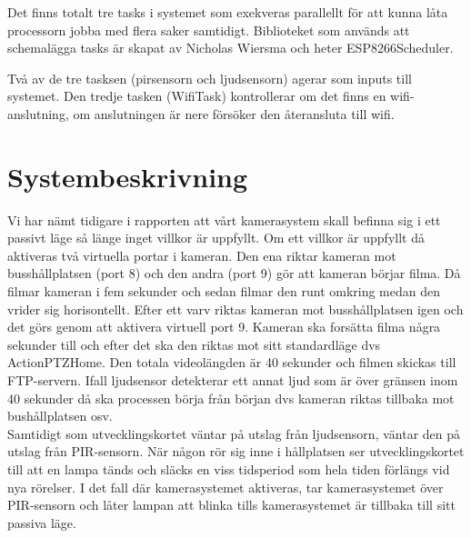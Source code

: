 Det finns totalt tre tasks i systemet som exekveras parallellt för att kunna låta processorn
jobba med flera saker samtidigt. Biblioteket som används att schemalägga tasks är skapat av Nicholas Wiersma och heter ESP8266Scheduler.

Två av de tre tasksen (pirsensorn och ljudsensorn) agerar som inputs till systemet. Den tredje tasken (WifiTask) kontrollerar om det finns en wifi-anslutning, om anslutningen är nere försöker den återansluta till wifi.


 








\clearpage
\section{Systembeskrivning}
Vi har nämt tidigare i rapporten att vårt kamerasystem skall befinna sig i ett passivt läge så länge inget villkor är uppfyllt. Om ett villkor är uppfyllt då aktiveras två virtuella portar i kameran. Den ena riktar kameran mot busshållplatsen (port 8) och den andra (port 9) gör att kameran börjar filma. Då filmar kameran i fem sekunder och sedan filmar den runt omkring medan den vrider sig horisontellt. Efter ett varv riktas kameran mot busshållplatsen igen och det görs genom att aktivera virtuell port 9. Kameran ska forsätta filma några sekunder till och efter det ska den riktas mot sitt standardläge dvs ActionPTZHome. Den totala videolängden är 40 sekunder och filmen skickas till FTP-servern. Ifall ljudsensor detekterar ett annat ljud som är över gränsen inom 40 sekunder då ska processen börja från början dvs kameran riktas tillbaka mot bushållplatsen osv.\\
 Samtidigt som utvecklingskortet väntar på utslag från ljudsensorn, väntar den på utslag från PIR-sensorn. När någon rör sig inne i hållplatsen ser utvecklingskortet till att en lampa tänds och släcks en viss tidsperiod som hela tiden förlängs vid nya rörelser. I det fall där kamerasystemet aktiveras, tar kamerasystemet över PIR-sensorn och låter lampan att blinka tills kamerasystemet är tillbaka till sitt passiva läge.


